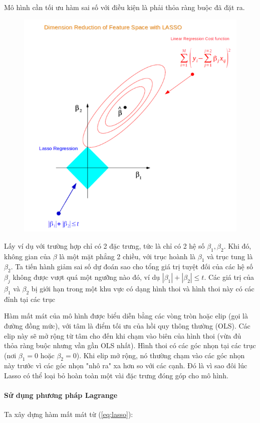 Mô hình cần tối ưu hàm sai số với điều kiện là phải thỏa ràng buộc đã đặt ra. 

\begin{figure}[H]
    \centering
    \includegraphics[width=0.7\linewidth]{img/geometry_lasso.png}
    \caption{}
    \label{fig:geometry_lasso}
\end{figure}

Lấy ví dụ với trường hợp chỉ có 2 đặc trưng, tức là chỉ có 2 hệ số $\beta_{1}, \beta_{2}$. Khi đó, không gian của $\beta$ là một mặt phẳng 2 chiều, với trục hoành là $\beta_{1}$ và trục tung là $\beta_{2}$. Ta tiến hành giảm sai số dự đoán sao cho tổng giá trị tuyệt đối của các hệ số \( \beta_j \) không được vượt quá một ngưỡng nào đó, ví dụ \( |\beta_1| + |\beta_2| \leq t \). Các giá trị của \( \beta_1 \) và \( \beta_2 \) bị giới hạn trong một khu vực có dạng hình thoi và hình thoi này có các đỉnh tại các trục

Hàm mất mát của mô hình được biểu diễn bằng các vòng tròn hoặc elip (gọi là đường đồng mức), với tâm là điểm tối ưu của hồi quy thông thường (OLS). Các elip này sẽ mở rộng từ tâm cho đến khi chạm vào biên của hình thoi (vừa đủ thỏa ràng buộc nhưng vần gần OLS nhất). Hình thoi có các góc nhọn tại các trục (nơi \( \beta_1 = 0 \) hoặc \( \beta_2 = 0 \)). Khi elip mở rộng, nó thường chạm vào các góc nhọn này trước vì các góc nhọn "nhô ra"  xa hơn so với các cạnh. Đó là vì sao đôi lúc Lasso có thể loại bỏ hoàn toàn một vài đặc trưng đóng góp cho mô hình.

\paragraph{Sử dụng phương pháp Lagrange} Ta xây dựng hàm mất mát từ (\ref{eq:lasso}):

